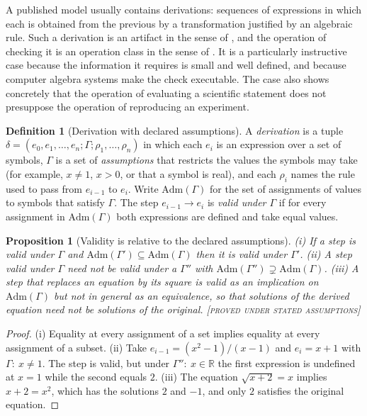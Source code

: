 \documentclass[11pt,twoside,openright]{book}
\theoremstyle{plain}
\newtheorem{proposition}[theorem]{Proposition}
\theoremstyle{definition}
\newtheorem{definition}[theorem]{Definition}
\theoremstyle{remark}
\newcommand{\Proved}{\textup{\textsc{[proved under stated assumptions]}}}
\begin{document}
A published model usually contains derivations: sequences of expressions in which each is obtained from the previous by a transformation justified by an algebraic rule. Such a derivation is an artifact in the sense of , and the operation of checking it is an operation class in the sense of . It is a particularly instructive case because the information it requires is small and well defined, and because computer algebra systems make the check executable. The case also shows concretely that the operation of evaluating a scientific statement does not presuppose the operation of reproducing an experiment.

\begin{definition}[Derivation with declared assumptions]\label{def:derivation}
A \emph{derivation} is a tuple $\delta=(e_0,e_1,\dots,e_n;\Gamma;\rho_1,\dots,\rho_n)$ in which each $e_i$ is an expression over a set of symbols, $\Gamma$ is a set of \emph{assumptions} that restricts the values the symbols may take (for example, $x\neq1$, $x>0$, or that a symbol is real), and each $\rho_i$ names the rule used to pass from $e_{i-1}$ to $e_i$. Write $\mathrm{Adm}(\Gamma)$ for the set of assignments of values to symbols that satisfy $\Gamma$. The step $e_{i-1}\to e_i$ is \emph{valid under $\Gamma$} if for every assignment in $\mathrm{Adm}(\Gamma)$ both expressions are defined and take equal values.
\end{definition}

\begin{proposition}[Validity is relative to the declared assumptions]\label{prop:stepvalidity}
(i) If a step is valid under $\Gamma$ and $\mathrm{Adm}(\Gamma')\subseteq\mathrm{Adm}(\Gamma)$ then it is valid under $\Gamma'$. (ii) A step valid under $\Gamma$ need not be valid under a $\Gamma''$ with $\mathrm{Adm}(\Gamma'')\supsetneq\mathrm{Adm}(\Gamma)$. (iii) A step that replaces an equation by its square is valid as an implication on $\mathrm{Adm}(\Gamma)$ but not in general as an equivalence, so that solutions of the derived equation need not be solutions of the original.
\Proved{}
\end{proposition}

\begin{proof}
(i) Equality at every assignment of a set implies equality at every assignment of a subset. (ii) Take $e_{i-1}=(x^2-1)/(x-1)$ and $e_i=x+1$ with $\Gamma:\ x\neq1$. The step is valid, but under $\Gamma'':\ x\in\mathbb{R}$ the first expression is undefined at $x=1$ while the second equals $2$. (iii) The equation $\sqrt{x+2}=x$ implies $x+2=x^2$, which has the solutions $2$ and $-1$, and only $2$ satisfies the original equation.
\end{proof}
\end{document}
